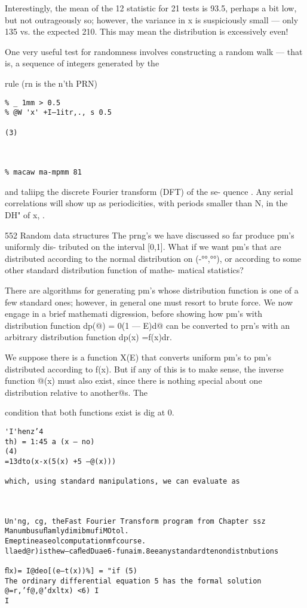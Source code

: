 \begin{verbatim}
\end{verbatim} 
 

Interestingly, the mean of the 12 statistic for 21 tests is 93.5,
perhaps a bit low, but not outrageously so; however, the variance
in x is suspiciously small — only 135 vs. the expected 210. This
may mean the distribution is excessively even!

One very useful test for randomness involves constructing a
random walk — that is, a sequence of integers generated by the

rule (rn is the n'th PRN)
\begin{verbatim}
% _ 1mm > 0.5
% @W 'x' +I—1itr,., s 0.5

(3)

 

% macaw ma-mpmm 81
\end{verbatim}

and taliipg the discrete Fourier transform (DFT) of the se-
quence . Any serial correlations will show up as periodicities,
with periods smaller than N, in the DH" of x, .

552 Random data structures
The prng’s we have discussed so far produce pm’s uniformly dis-
tributed on the interval [0,1]. What if we want pm’s that are
distributed according to the normal distribution on (-°°,°°), or
according to some other standard distribution function of mathe-
matical statistics?

There are algorithms for generating pm’s whose distribution
function is one of a few standard ones; however, in general one
must resort to brute force. We now engage in a brief mathemati
digression, before showing how pm’s with distribution function
dp(@) = 0(1 — E)d@ can be converted to prn’s with an arbitrary
distribution function dp(x) =f(x)dr.

We suppose there is a function X(E) that converts uniform pm's
to pm’s distributed according to f(x). But if any of this is to make
sense, the inverse function @(x) must also exist, since there is
nothing special about one distribution relative to another@s. The

condition that both functions exist is dig at 0.

\begin{verbatim}
'I'henz’4
th) = 1:45 a (x — no)
(4)
=13dto(x-x(5(x) +5 —@(x)))

which, using standard manipulations, we can evaluate as

 

Un'ng, cg, theFast Fourier Transform program from Chapter ssz
ManumbusuﬂamlydimibmufiMOtol.
Emeptineaseolcomputationmfcourse.
llaed@r)isthew—caﬂedDuae6-funaim.8eeanystandardtenondistnbutions

ﬂx)= I@deo[(e—t(x))%] = "if (5)
The ordinary differential equation 5 has the formal solution
@=r,’f@,@’dxltx) <6) I
I
\end{verbatim}

